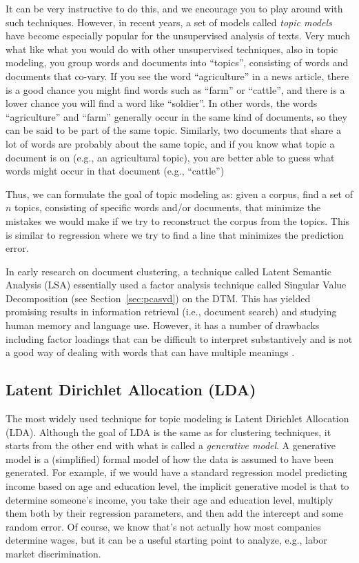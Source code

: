 It can be very instructive to do this, and we encourage you to play around with such techniques. However, in recent years, a set of models called \emph{topic models} have become especially popular for the unsupervised analysis of texts. Very much what like what you would do with other unsupervised techniques, also in topic modeling, you group words and documents into ``topics'', consisting of words and documents that co-vary.
If you see the word ``agriculture'' in a news article, there is a good chance you might find words such as ``farm'' or ``cattle'',
and there is a lower chance you will find a word like ``soldier''.
In other words, the words ``agriculture'' and ``farm'' generally occur in the same kind of documents, so they can be said to be part of the same topic.
Similarly, two documents that share a lot of words are probably about the same topic,
and if you know what topic a document is on (e.g., an agricultural topic), you are better able to guess what words might occur in that document (e.g., ``cattle'')

Thus, we can formulate the goal of topic modeling as: given a corpus, find a set of $n$ topics, consisting of specific words and/or documents, that minimize the mistakes we would make if we try to reconstruct the corpus from the topics.
This is similar to regression where we try to find a line that minimizes the prediction error.

In early research on document clustering, a technique called Latent Semantic Analysis (LSA) essentially used a factor analysis technique called Singular Value Decomposition (see Section~\ref{sec:pcasvd}) on the DTM.
This has yielded promising results in information retrieval (i.e., document search) and studying human memory and language use.
However, it has a number of drawbacks including factor loadings that can be difficult to interpret substantively and is not a good way of dealing with words that can have multiple meanings \citep{lsa}.

\subsection{Latent Dirichlet Allocation (LDA)}

The most widely used technique for topic modeling is Latent Dirichlet Allocation (LDA).
Although the goal of LDA is the same as for clustering techniques, it starts from the other end with what is called a \emph{generative model}.
A generative model is a (simplified) formal model of how the data is assumed to have been generated.
For example, if we would have a standard regression model predicting income based on age and education level,
the implicit generative model is that to determine someone's income, you take their age and education level,
multiply them both by their regression parameters, and then add the intercept and some random error.
Of course, we know that's not actually how most companies determine wages, but it can be a useful starting point to analyze, e.g., labor market discrimination.

